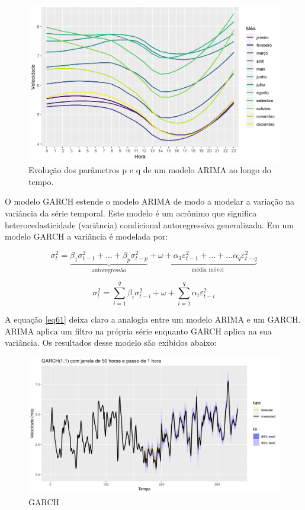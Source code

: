 \documentclass[
	12pt,				%
	openright,			%
	oneside,			%
	a4paper,			%
	english,			%
	french,				%
	spanish,			%
	brazil				%
	]{abntex2}
\begin{document}
\begin{figure}[h]
    \centering
	\includegraphics[width=\textwidth]{diurnal}
	\caption{Evolução dos parâmetros p e q de um modelo ARIMA ao longo do tempo.}
\end{figure}
\FloatBarrier

O modelo GARCH estende o modelo ARIMA de modo a modelar a variação na variância da série temporal. Este modelo é um acrônimo que significa heterocedasticidade (variância) condicional autoregressiva generalizada. Em um modelo GARCH a variância é modelada por:

\begin{equation}\label{eq61}
\sigma_t^2 = \underbrace{\beta_1\sigma_{t-1}^2 + \dots + \beta_p\sigma_{t-p}^2}_\text{autoregressão}  + \underbrace{\omega + \alpha_1\varepsilon_{t-1}^2 + \dots + \dots \alpha_q\varepsilon_{t-q}^2}_\text{média móvel} 
\end{equation}

\begin{equation}
\sigma_t^2 = \sum\limits_{i=1}^q\beta_i\sigma_{t-i}^2 + \omega + \sum\limits_{i=1}^q\alpha_i\varepsilon_{t-i}^2
\end{equation}

A equação \ref{eq61} deixa claro a analogia entre um modelo ARIMA e um GARCH. ARIMA aplica um filtro na própria série enquanto GARCH aplica na sua variância. Os resultados desse modelo são exibidos abaixo:

\begin{figure}[h]
    \centering
	\includegraphics[width=\textwidth]{garch_first}
	\caption{GARCH}
\end{figure}
\FloatBarrier
\end{document}
